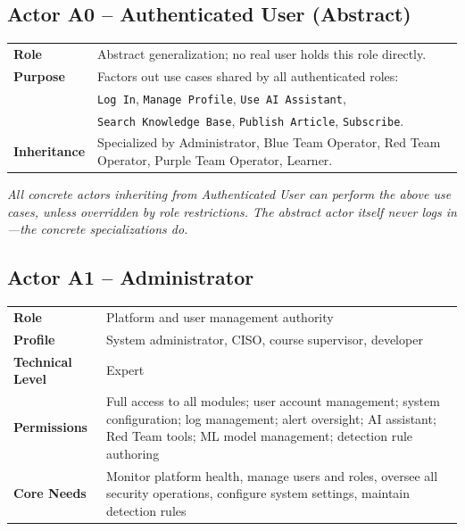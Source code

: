 \documentclass[12pt,a4paper]{report}
\begin{document}
	\subsection{Actor A0 -- Authenticated User (Abstract)}
	\begin{infobox}[title=Authenticated User]
		\begin{tabular}{L{3.8cm} L{8.8cm}}
			\textbf{Role} & Abstract generalization; no real user holds this role directly. \\
			\textbf{Purpose} & Factors out use cases shared by all authenticated roles: \\
			& \texttt{Log In}, \texttt{Manage Profile}, \texttt{Use AI Assistant}, \\
			& \texttt{Search Knowledge Base}, \texttt{Publish Article}, \texttt{Subscribe}. \\
			\textbf{Inheritance} & Specialized by Administrator, Blue Team Operator, Red Team Operator, Purple Team Operator, Learner. \\
		\end{tabular}
	\end{infobox}
	\textit{All concrete actors inheriting from Authenticated User can perform the above use cases, unless overridden by role restrictions. The abstract actor itself never logs in—the concrete specializations do.}
	
	\subsection{Actor A1 -- Administrator}
	\begin{infobox}[title=Administrator]
		\begin{tabular}{L{3.8cm} L{8.8cm}}
			\textbf{Role} & Platform and user management authority \\
			\textbf{Profile} & System administrator, CISO, course supervisor, developer \\
			\textbf{Technical Level} & Expert \\
			\textbf{Permissions} & Full access to all modules; user account management; system configuration; log management; alert oversight; AI assistant; Red Team tools; ML model management; detection rule authoring \\
			\textbf{Core Needs} & Monitor platform health, manage users and roles, oversee all security operations, configure system settings, maintain detection rules \\
		\end{tabular}
	\end{infobox}
	
\end{document}
